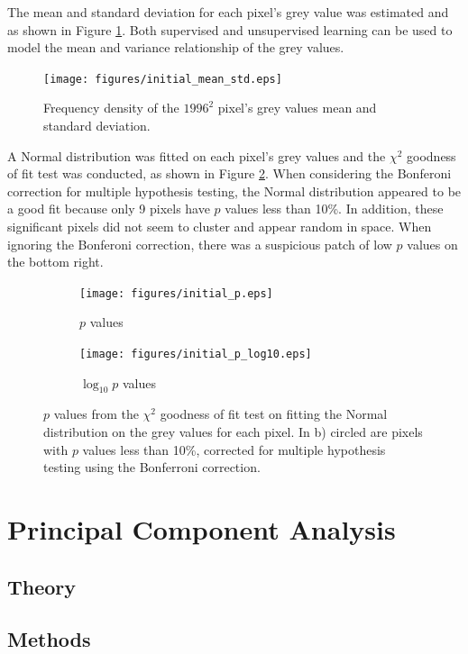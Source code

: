 \documentclass[12pt]{report}
\begin{document}
The mean and standard deviation for each pixel's grey value was estimated and as shown in Figure \ref{fig:initial_mean_std}. Both supervised and unsupervised learning can be used to model the mean and variance relationship of the grey values.

\begin{figure}
	\centering
	\texttt{[image: figures/initial\_mean\_std.eps]}
	\caption{Frequency density of the $1996^2$ pixel's grey values mean and standard deviation.}
	\label{fig:initial_mean_std}
\end{figure}

A Normal distribution was fitted on each pixel's grey values and the $\chi^2$ goodness of fit test was conducted, as shown in Figure \ref{fig:initial_fit_normal_test}. When considering the Bonferoni correction for multiple hypothesis testing, the Normal distribution appeared to be a good fit because only 9 pixels have $p$ values less than 10\%. In addition, these significant pixels did not seem to cluster and appear random in space. When ignoring the Bonferoni correction, there was a suspicious patch of low $p$ values on the bottom right.

\begin{figure}
\centering
	\begin{subfigure}[b]{0.75\textwidth}
		\texttt{[image: figures/initial\_p.eps]}
		\caption{$p$ values}
	\end{subfigure}
	\begin{subfigure}[b]{0.75\textwidth}
		\texttt{[image: figures/initial\_p\_log10.eps]}
		\caption{$\log_{10} p$ values}
	\end{subfigure}
	\caption{$p$ values from the $\chi^2$ goodness of fit test on fitting the Normal distribution on the grey values for each pixel. In b) circled are pixels with $p$ values less than 10\%, corrected for multiple hypothesis testing using the Bonferroni correction.}
	\label{fig:initial_fit_normal_test}
\end{figure}

\section{Principal Component Analysis}
\subsection{Theory}
\subsection{Methods}
\end{document}
